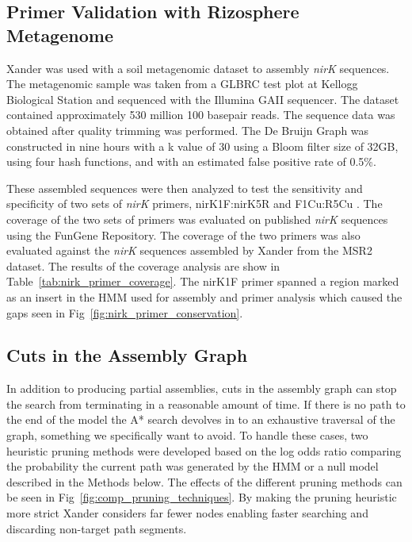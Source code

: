 \documentclass[10pt]{bmc_article}
\newenvironment{bmcformat}{\begin{raggedright}\baselineskip20pt\sloppy\setboolean{publ}{false}}{\end{raggedright}\baselineskip20pt\sloppy}
\begin{document}
\begin{bmcformat}
\subsection*{Primer Validation with Rizosphere Metagenome}
Xander was used with a soil metagenomic dataset to assembly \emph{nirK} sequences.  The metagenomic sample was taken from a GLBRC test plot at Kellogg Biological Station and sequenced with the Illumina GAII sequencer.  The dataset contained approximately 530 million 100 basepair reads.  The sequence data was obtained after quality trimming was performed. The De Bruijn Graph was constructed in nine hours with a k value of 30 using a Bloom filter size of 32GB, using four hash functions, and with an estimated false positive rate of 0.5\%.

These assembled sequences were then analyzed to test the sensitivity and specificity of two sets of \emph{nirK} primers, nirK1F:nirK5R \cite{braker_development_1998} and F1Cu:R5Cu \cite{hallin_pcr_1999}.  The coverage of the two sets of primers was evaluated on published \emph{nirK} sequences using the FunGene Repository.  The coverage of the two primers was also evaluated against the \emph{nirK} sequences assembled by Xander from the MSR2 dataset.  The results of the coverage analysis are show in Table~\ref{tab:nirk_primer_coverage}.  The nirK1F primer spanned a region marked as an insert in the HMM used for assembly and primer analysis which caused the gaps seen in Fig~\ref{fig:nirk_primer_conservation}.

\subsection*{Cuts in the Assembly Graph}

In addition to producing partial assemblies, cuts in the assembly graph can stop the search from terminating in a reasonable amount of time. If there is no path to the end of the model the A* search devolves in to an exhaustive traversal of the graph, something we specifically want to avoid.  To handle these cases, two heuristic pruning methods were developed based on the log odds ratio comparing the probability the current path was generated by the HMM or a null model described in the Methods below.  The effects of the different pruning methods can be seen in Fig~\ref{fig:comp_pruning_techniques}.  By making the pruning heuristic more strict Xander considers far fewer nodes enabling faster searching and discarding non-target path segments.


\end{bmcformat}
\end{document}
